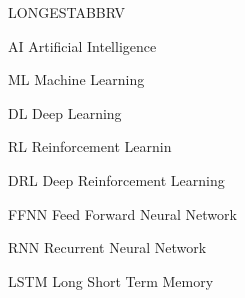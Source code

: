\begin{theglossary}{LONGESTABBRV}
\item[AI] Artificial Intelligence
\item[ML] Machine Learning
\item[DL] Deep Learning
\item[RL] Reinforcement Learnin
\item[DRL] Deep Reinforcement Learning
\item[FFNN] Feed Forward Neural Network
\item[RNN] Recurrent Neural Network
\item[LSTM] Long Short Term Memory

\end{theglossary}
